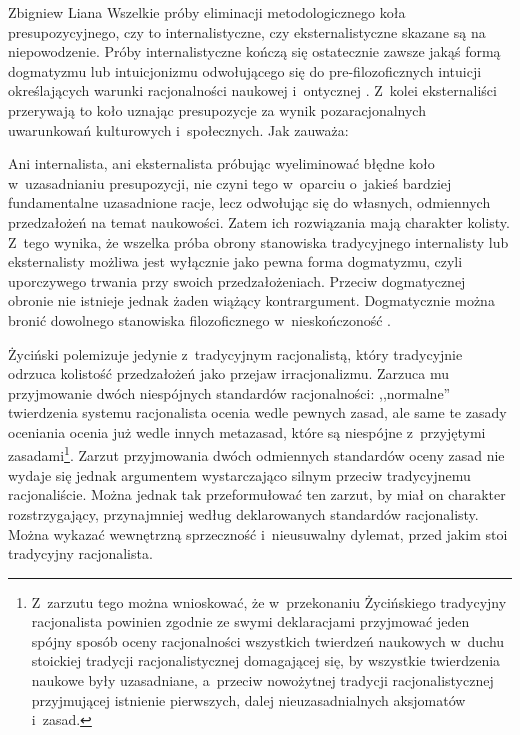 \begin{artplenv}{Zbigniew Liana}
Wszelkie próby eliminacji metodologicznego koła presupozycyjnego, czy to internalistyczne, czy eksternalistyczne skazane są na niepowodzenie. Próby internalistyczne kończą się ostatecznie zawsze jakąś formą dogmatyzmu lub intuicjonizmu odwołującego się do pre-filozoficznych intuicji określających warunki racjonalności naukowej i~ontycznej
\parencite[][s.~129.172]{zycinski_teizm_1985}. %
 Z~kolei eksternaliści przerywają to koło uznając presupozycje za wynik pozaracjonalnych uwarunkowań kulturowych i~społecznych. Jak zauważa:


Ani internalista, ani eksternalista próbując wyeliminować błędne koło w~uzasadnianiu presupozycji, nie czyni tego w~oparciu o~jakieś bardziej fundamentalne uzasadnione racje, lecz odwołując się do własnych, odmiennych przedzałożeń na temat naukowości. Zatem ich rozwiązania mają charakter kolisty. Z~tego wynika, że wszelka próba obrony stanowiska tradycyjnego internalisty lub eksternalisty możliwa jest wyłącznie jako pewna forma dogmatyzmu, czyli uporczywego trwania przy swoich przedzałożeniach. Przeciw dogmatycznej obronie nie istnieje jednak żaden wiążący kontrargument. Dogmatycznie można bronić dowolnego stanowiska filozoficznego w~nieskończoność
\parencite[][s.~129]{zycinski_teizm_1985}.%


Życiński polemizuje jedynie z~tradycyjnym racjonalistą, który tradycyjnie odrzuca kolistość przedzałożeń jako przejaw irracjonalizmu. Zarzuca mu
\parencite[][s.~156n]{zycinski_teizm_1985} %
 przyjmowanie dwóch niespójnych standardów racjonalności: ,,normalne'' twierdzenia systemu racjonalista ocenia wedle pewnych zasad, ale same te zasady oceniania ocenia już wedle innych metazasad, które są niespójne z~przyjętymi zasadami\footnote{Z~zarzutu tego można wnioskować, że w~przekonaniu Życińskiego tradycyjny racjonalista powinien zgodnie ze swymi deklaracjami przyjmować jeden spójny sposób oceny racjonalności wszystkich twierdzeń naukowych w~duchu stoickiej tradycji racjonalistycznej domagającej się, by wszystkie twierdzenia naukowe były uzasadniane, a~przeciw nowożytnej tradycji racjonalistycznej przyjmującej istnienie pierwszych, dalej nieuzasadnialnych aksjomatów i~zasad.}. Zarzut przyjmowania dwóch odmiennych standardów oceny zasad nie wydaje się jednak argumentem wystarczająco silnym przeciw tradycyjnemu racjonaliście. Można jednak tak przeformułować ten zarzut, by miał on charakter rozstrzygający, przynajmniej według deklarowanych standardów racjonalisty. Można wykazać wewnętrzną sprzeczność i~nieusuwalny dylemat, przed jakim stoi tradycyjny racjonalista.


\end{artplenv}

